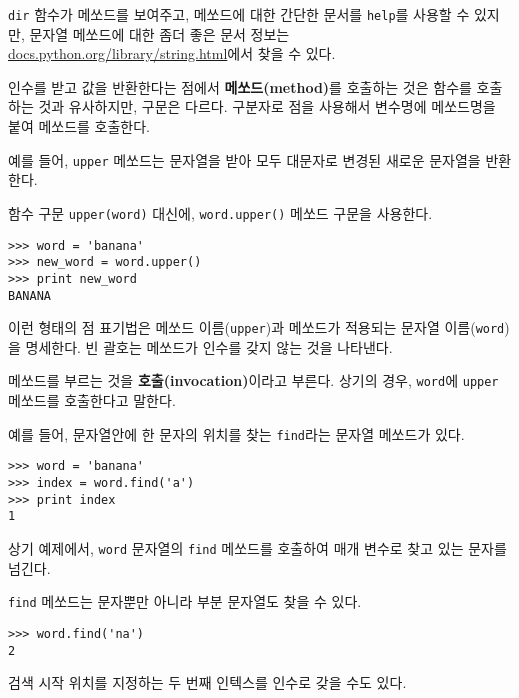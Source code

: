 {\tt dir} 함수가 메쏘드를 보여주고, 메쏘드에 대한 간단한 문서를 {\tt help}를 사용할 수 있지만,
문자열 메쏘드에 대한 좀더 좋은 문서 정보는 \url{docs.python.org/library/string.html}에서 찾을 수 있다.

인수를 받고 값을 반환한다는 점에서 {\bf 메쏘드(method)}를 호출하는 것은 함수를 호출하는 것과 유사하지만, 구문은 다르다.
구분자로 점을 사용해서 변수명에 메쏘드명을 붙여 메쏘드를 호출한다.

예를 들어, {\tt upper} 메쏘드는 문자열을 받아 모두 대문자로 변경된 새로운 문자열을 반환한다.


함수 구문 {\tt upper(word)} 대신에, {\tt word.upper()} 메쏘드 구문을 사용한다.


\beforeverb
\begin{verbatim}
>>> word = 'banana'
>>> new_word = word.upper()
>>> print new_word
BANANA
\end{verbatim}
\afterverb
%

이런 형태의 점 표기법은 메쏘드 이름({\tt upper})과 메쏘드가 적용되는 문자열 이름({\tt word})을 명세한다.
빈 괄호는 메쏘드가 인수를 갖지 않는 것을 나타낸다.


메쏘드를 부르는 것을 {\bf 호출(invocation)}이라고 부른다. 상기의 경우, {\tt word}에 {\tt upper} 메쏘드를 호출한다고 말한다.


예를 들어, 문자열안에 한 문자의 위치를 찾는 {\tt find}라는 문자열 메쏘드가 있다.

\beforeverb
\begin{verbatim}
>>> word = 'banana'
>>> index = word.find('a')
>>> print index
1
\end{verbatim}
\afterverb
%

상기 예제에서, {\tt word} 문자열의 {\tt find} 메쏘드를 호출하여 매개 변수로 찾고 있는 문자를 넘긴다.

{\tt find} 메쏘드는 문자뿐만 아니라 부분 문자열도 찾을 수 있다.

\beforeverb
\begin{verbatim}
>>> word.find('na')
2
\end{verbatim}
\afterverb
%

검색 시작 위치를 지정하는 두 번째 인텍스를 인수로 갖을 수도 있다.


